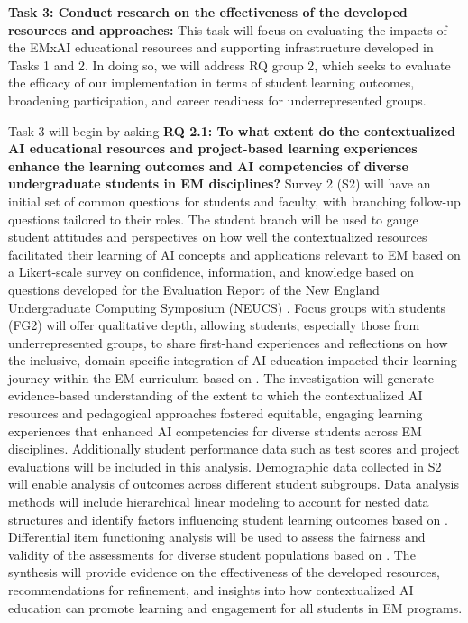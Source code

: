 \documentclass[11pt]{article}
\begin{document}
\begin{tcolorbox}[colback=mycmykcolor, colframe=black, boxrule=1pt, coltext=black]
\textbf{Task 3: Conduct research on the effectiveness of the developed resources and approaches:} This task will focus on evaluating the impacts of the EMxAI educational resources and supporting infrastructure developed in Tasks 1 and 2. In doing so, we will address RQ group 2, which seeks to evaluate the efficacy of our implementation in terms of student learning outcomes, broadening participation, and career readiness for underrepresented groups.
\end{tcolorbox}

Task 3 will begin by asking \textbf{RQ 2.1: To what extent do the contextualized AI educational resources and project-based learning experiences enhance the learning outcomes and AI competencies of diverse undergraduate students in EM disciplines?} 
Survey 2 (S2) will have an initial set of common questions for students and faculty, with branching follow-up questions tailored to their roles. 
The student branch will be used to gauge student attitudes and perspectives on how well the contextualized resources facilitated their learning of AI concepts and applications relevant to EM based on a Likert-scale survey on confidence, information, and knowledge based on questions developed for the Evaluation Report of the New England Undergraduate Computing Symposium (NEUCS) \cite{Cossa2010}.
Focus groups with students (FG2) will offer qualitative depth, allowing students, especially those from underrepresented groups, to share first-hand experiences and reflections on how the inclusive, domain-specific integration of AI education impacted their learning journey within the EM curriculum based on \cite{Cossa2010}.
The investigation will generate evidence-based understanding of the extent to which the contextualized AI resources and pedagogical approaches fostered equitable, engaging learning experiences that enhanced AI competencies for diverse students across EM disciplines. 
Additionally student performance data such as test scores and project evaluations will be included in this analysis. 
Demographic data collected in S2 will enable analysis of outcomes across different student subgroups. 
Data analysis methods will include hierarchical linear modeling to account for nested data structures and identify factors influencing student learning outcomes based on \cite{woltman2012introduction, raudenbush2002hierarchical,ma2000hierarchical}. 
Differential item functioning analysis will be used to assess the fairness and validity of the assessments for diverse student populations based on \cite{martinkova2017checking,osterlind2009differential,adams2020blended}. 
The synthesis will provide evidence on the effectiveness of the developed resources, recommendations for refinement, and insights into how contextualized AI education can promote learning and engagement for all students in EM programs.
\end{document}
